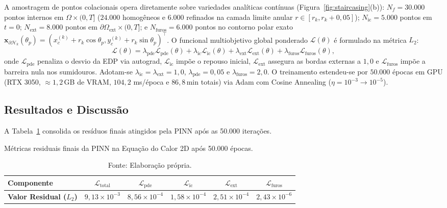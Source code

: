 \documentclass[a4paper, 12pt, twoside]{article}
\begin{document}
A amostragem de pontos colacionais opera diretamente sobre variedades analíticas contínuas (Figura~\ref{fig:staircasing}(b)): $N_f = 30.000$ pontos internos em $\Omega \times (0, T]$ ($24.000$ homogêneos e $6.000$ refinados na camada limite anular $r \in [r_k, r_k + 0{,}05]$); $N_{\mathrm{ic}} = 5.000$ pontos em $t=0$; $N_{\mathrm{ext}} = 8.000$ pontos em $\partial\Omega_{\mathrm{ext}} \times (0, T]$; e $N_{\mathrm{furos}} = 6.000$ pontos no contorno polar exato $\mathbf{x}_{\partial\mathcal{H}_k}(\theta_p) = (x_c^{(k)} + r_k \cos\theta_p, y_c^{(k)} + r_k \sin\theta_p)^\top$. O funcional multiobjetivo global ponderado $\mathcal{L}(\theta)$ é formulado na métrica $L_2$:
\begin{equation}
    \mathcal{L}(\theta) = \lambda_{\mathrm{pde}} \mathcal{L}_{\mathrm{pde}}(\theta) + \lambda_{\mathrm{ic}} \mathcal{L}_{\mathrm{ic}}(\theta) + \lambda_{\mathrm{ext}} \mathcal{L}_{\mathrm{ext}}(\theta) + \lambda_{\mathrm{furos}} \mathcal{L}_{\mathrm{furos}}(\theta),
\end{equation}
onde $\mathcal{L}_{\mathrm{pde}}$ penaliza o desvio da EDP via autograd, $\mathcal{L}_{\mathrm{ic}}$ impõe o repouso inicial, $\mathcal{L}_{\mathrm{ext}}$ assegura as bordas externas a $1{,}0$ e $\mathcal{L}_{\mathrm{furos}}$ impõe a barreira nula nos sumidouros. Adotam-se $\lambda_{\mathrm{ic}} = \lambda_{\mathrm{ext}} = 1{,}0$, $\lambda_{\mathrm{pde}} = 0{,}05$ e $\lambda_{\mathrm{furos}} = 2{,}0$. O treinamento estendeu-se por $50.000$ épocas em GPU (RTX 3050, $\approx 1{,}2$\,GB de VRAM, $104{,}2$ ms/época e $86{,}8$\,min totais) via Adam com Cosine Annealing ($\eta = 10^{-3} \to 10^{-5}$).

\subsection{Resultados e Discussão}

A Tabela~\ref{tab:perdas_finais} consolida os resíduos finais atingidos pela PINN após as 50.000 iterações.

\begin{table}[ht]
\caption{Métricas residuais finais da PINN na Equação do Calor 2D após 50.000 épocas.}
\label{tab:perdas_finais}
\centering
\small
\begin{tabular}{lccccc}
\toprule
\textbf{Componente} & $\mathcal{L}_{\mathrm{total}}$ & $\mathcal{L}_{\mathrm{pde}}$ & $\mathcal{L}_{\mathrm{ic}}$ & $\mathcal{L}_{\mathrm{ext}}$ & $\mathcal{L}_{\mathrm{furos}}$ \\
\midrule
\textbf{Valor Residual ($L_2$)} & $9{,}13 \times 10^{-3}$ & $8{,}56 \times 10^{-4}$ & $1{,}58 \times 10^{-4}$ & $2{,}51 \times 10^{-4}$ & $2{,}43 \times 10^{-6}$ \\
\bottomrule
\end{tabular}
\caption*{Fonte: Elaboração própria.}
\end{table}
\end{document}
